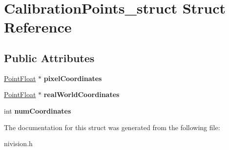 \hypertarget{structCalibrationPoints__struct}{
\section{CalibrationPoints\_\-struct Struct Reference}
\label{structCalibrationPoints__struct}
}
\subsection*{Public Attributes}
\begin{DoxyCompactItemize}
\item 
\hypertarget{structCalibrationPoints__struct_ad3b3997a9943c1ff9bbc69879f91b118}{
\hyperlink{structPointFloat__struct}{PointFloat} $\ast$ {\bfseries pixelCoordinates}}
\label{structCalibrationPoints__struct_ad3b3997a9943c1ff9bbc69879f91b118}

\item 
\hypertarget{structCalibrationPoints__struct_aa54609acfcbc76366079d4c4f8f3ca43}{
\hyperlink{structPointFloat__struct}{PointFloat} $\ast$ {\bfseries realWorldCoordinates}}
\label{structCalibrationPoints__struct_aa54609acfcbc76366079d4c4f8f3ca43}

\item 
\hypertarget{structCalibrationPoints__struct_a73616df3da2f846673b2f3b4d918c4d9}{
int {\bfseries numCoordinates}}
\label{structCalibrationPoints__struct_a73616df3da2f846673b2f3b4d918c4d9}

\end{DoxyCompactItemize}


The documentation for this struct was generated from the following file:\begin{DoxyCompactItemize}
\item 
nivision.h\end{DoxyCompactItemize}
